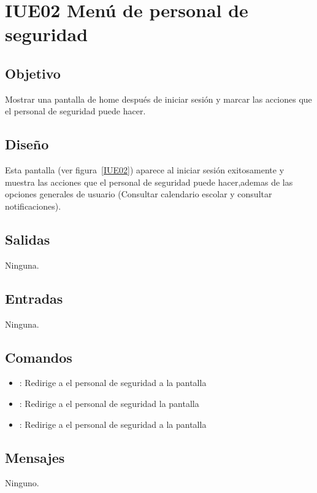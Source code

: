 \section{IUE02 Menú de personal de seguridad}

\subsection{Objetivo}
Mostrar una pantalla de home después de iniciar sesión y marcar las acciones que el personal de seguridad puede hacer.

\subsection{Diseño}
Esta pantalla  (ver figura~\ref{IUE02}) aparece al iniciar sesión exitosamente y muestra las acciones que el personal de seguridad puede hacer,ademas de las opciones generales de usuario (Consultar calendario escolar y consultar notificaciones). 


\subsection{Salidas}

Ninguna.

\subsection{Entradas}
Ninguna.

\subsection{Comandos}
\begin{itemize}
	\item {}: Redirige a el personal de seguridad a la pantalla 
	
	\item {}: Redirige a el personal de seguridad la pantalla 
	
	\item {}: Redirige a el personal de seguridad a la pantalla 
	
\end{itemize}

\subsection{Mensajes}

\begin{Citemize}
	\item Ninguno.
\end{Citemize}

